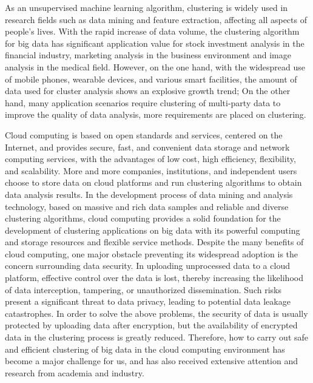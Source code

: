 \begin{eabstract}
As an unsupervised machine learning algorithm, clustering is widely used in research fields such as data mining and feature extraction, affecting all aspects of people's lives. With the rapid increase of data volume, the clustering algorithm for big data has significant application value for stock investment analysis in the financial industry, marketing analysis in the business environment and image analysis in the medical field. However, on the one hand, with the widespread use of mobile phones, wearable devices, and various smart facilities, the amount of data used for cluster analysis shows an explosive growth trend; On the other hand, many application scenarios require clustering of multi-party data to improve the quality of data analysis, more requirements are placed on clustering.

Cloud computing is based on open standards and services, centered on the Internet, and provides secure, fast, and convenient data storage and network computing services, with the advantages of low cost, high efficiency, flexibility, and scalability. More and more companies, institutions, and independent users choose to store data on cloud platforms and run clustering algorithms to obtain data analysis results.
In the development process of data mining and analysis technology, based on massive and rich data samples and reliable and diverse clustering algorithms, cloud computing provides a solid foundation for the development of clustering applications on big data with its powerful computing and storage resources and flexible service methods.
Despite the many benefits of cloud computing, one major obstacle preventing its widespread adoption is the concern surrounding data security. In uploading unprocessed data to a cloud platform, effective control over the data is lost, thereby increasing the likelihood of data interception, tampering, or unauthorized dissemination. Such risks present a significant threat to data privacy, leading to potential data leakage catastrophes.
In order to solve the above problems, the security of data is usually protected by uploading data after encryption, but the availability of encrypted data in the clustering process is greatly reduced. Therefore, how to carry out safe and efficient clustering of big data in the cloud computing environment has become a major challenge for us, and has also received extensive attention and research from academia and industry.


\end{eabstract}
